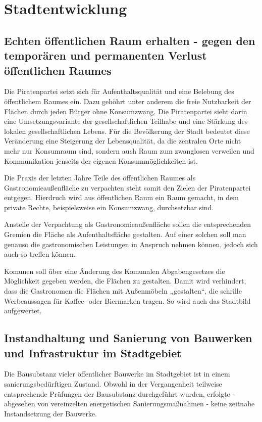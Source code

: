 \chapter{Stadtentwicklung}

  \section{Echten öffentlichen Raum erhalten - gegen den temporären und 
  permanenten Verlust öffentlichen Raumes}
  
  Die Piratenpartei setzt sich für Aufenthaltsqualität und eine Belebung des 
  öffentlichem Raumes ein. Dazu gehöhrt unter anderem die freie Nutzbarkeit 
  der Flächen durch jeden Bürger ohne Konsumzwang. Die Piratenpartei sieht 
  darin eine Umsetzungsvariante der gesellschaftlichen Teilhabe und eine 
  Stärkung des lokalen gesellschaftlichen Lebens. Für die Bevölkerung der 
  Stadt bedeutet diese Veränderung eine Steigerung der Lebensqualität, da die 
  zentralen Orte nicht mehr nur Konsumraum sind, sondern auch Raum zum 
  zwanglosen verweilen und Kommunikation jenseits der eigenen 
  Konsummöglichkeiten ist.
  
  Die Praxis der letzten Jahre Teile des öffentlichen Raumes als 
  Gastronomieaußenfläche zu verpachten steht somit den Zielen der 
  Piratenpartei entgegen. Hierdruch wird aus öffentlichen Raum ein Raum 
  gemacht, in dem private Rechte, beispielsweise ein Konsumzwang, durchsetzbar 
  sind.
  
  Anstelle der Verpachtung als Gastronomieaußenfläche sollen die 
  entsprechenden Gremien die Fläche als Aufenthaltsfläche gestalten. Auf einer 
  solchen soll man genauso die gastronomischen Leistungen in Anspruch nehmen 
  können, jedoch sich auch so treffen können.
  
  Komunen soll über eine Änderung des Komunalen Abgabengesetzes die 
  Möglichkeit gegeben werden, die Flächen zu gestalten. Damit wird verhindert, 
  dass die Gastronomen die Flächen mit Außenmöbeln „gestalten“, die schrille 
  Werbeaussagen für Kaffee- oder Biermarken tragen. So wird auch das Stadtbild 
  aufgewertet.
  
  \section{Instandhaltung und Sanierung von Bauwerken und Infrastruktur im 
  Stadtgebiet}
  
  Die Bausubstanz vieler öffentlicher Bauwerke im Stadtgebiet ist in einem 
  sanierungsbedürftigen Zustand. Obwohl in der Vergangenheit teilweise 
  entsprechende Prüfungen der Bausubstanz durchgeführt wurden, erfolgte - 
  abgesehen von vereinzelten energetischen Sanierungsmaßnahmen - keine 
  zeitnahe Instandsetzung der Bauwerke.
  
